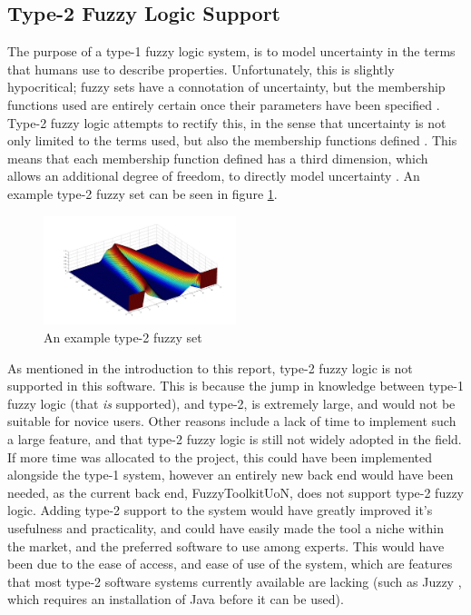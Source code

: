 \subsection{Type-2 Fuzzy Logic Support}
\label{sec:type2}
The purpose of a type-1 fuzzy logic system, is to model uncertainty in the terms that humans use to describe properties. Unfortunately, this is slightly hypocritical; fuzzy sets have a connotation of uncertainty, but the membership functions used are entirely certain once their parameters have been specified \cite{mendel2003type}. Type-2 fuzzy logic attempts to rectify this, in the sense that uncertainty is not only limited to the terms used, but also the membership functions defined \cite{castillo2003type}. This means that each membership function defined has a third dimension, which allows an additional degree of freedom, to directly model uncertainty \cite{mendel2002type}. An example type-2 fuzzy set can be seen in figure \ref{fig:fw-type2}.
\begin{figure}[ht!]
	\begin{center}
		\includegraphics[width=0.5\textwidth]{images/type2set}
	\end{center}
	\vspace{-4mm}
	\caption{An example type-2 fuzzy set}
	\label{fig:fw-type2}
	\vspace{-1mm}
\end{figure}
\noindent
As mentioned in the introduction to this report, type-2 fuzzy logic is not supported in this software. This is because the jump in knowledge between type-1 fuzzy logic (that \emph{is} supported), and type-2, is extremely large, and would not be suitable for novice users. Other reasons include a lack of time to implement such a large feature, and that type-2 fuzzy logic is still not widely adopted in the field. If more time was allocated to the project, this could have been implemented alongside the type-1 system, however an entirely new back end would have been needed, as the current back end, FuzzyToolkitUoN, does not support type-2 fuzzy logic. Adding type-2 support to the system would have greatly improved it's usefulness and practicality, and could have easily made the tool a niche within the market, and the preferred software to use among experts. This would have been due to the ease of access, and ease of use of the system, which are  features that most type-2 software systems currently available are lacking (such as Juzzy \cite{wagner2013juzzy}, which requires an installation of Java before it can be used).

